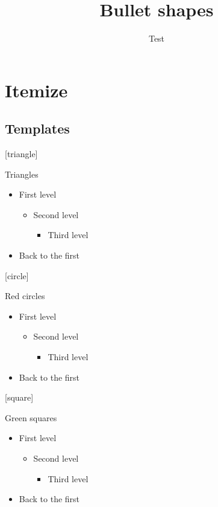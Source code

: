 \documentclass[aspectratio=169]{beamer}
\title{Bullet shapes}
\author{Test}
\date{}
\begin{document}
\section{Itemize}
\subsection{Templates}

{
[triangle]
\begin{frame}{Triangles}
  \begin{itemize}
    \item First level
      \begin{itemize}
        \item Second level
          \begin{itemize}
            \item Third level
          \end{itemize}
      \end{itemize}
    \item Back to the first
  \end{itemize}
\end{frame}
}

{
[circle]
\begin{frame}{Red circles}
  \begin{itemize}
    \item First level
      \begin{itemize}
        \item Second level
          \begin{itemize}
            \item Third level
          \end{itemize}
      \end{itemize}
    \item Back to the first
  \end{itemize}
\end{frame}
}

{
[square]
\begin{frame}{Green squares}
  \begin{itemize}
    \item First level
      \begin{itemize}
        \item Second level
          \begin{itemize}
            \item Third level
          \end{itemize}
      \end{itemize}
    \item Back to the first
  \end{itemize}
\end{frame}
}
\end{document}
